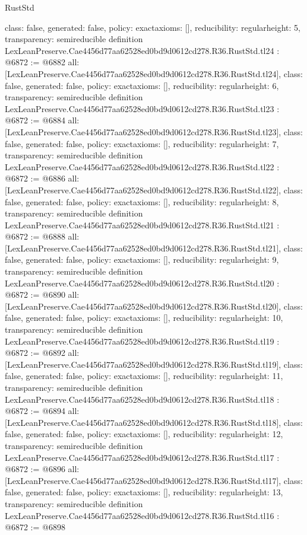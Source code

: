 \begin{lexlean}{RustStd}
\begin{coremodule}
{  class: false,
  generated: false,
  policy: exact{axioms: []},
  reducibility: regular{height: 5},
  transparency: semireducible
}
definition LexLeanPreserve.Cae4456d77aa62528ed0bd9d0612cd278.R36.RustStd.tl24 : @6872 := @6882 {
  all: [LexLeanPreserve.Cae4456d77aa62528ed0bd9d0612cd278.R36.RustStd.tl24],
  class: false,
  generated: false,
  policy: exact{axioms: []},
  reducibility: regular{height: 6},
  transparency: semireducible
}
definition LexLeanPreserve.Cae4456d77aa62528ed0bd9d0612cd278.R36.RustStd.tl23 : @6872 := @6884 {
  all: [LexLeanPreserve.Cae4456d77aa62528ed0bd9d0612cd278.R36.RustStd.tl23],
  class: false,
  generated: false,
  policy: exact{axioms: []},
  reducibility: regular{height: 7},
  transparency: semireducible
}
definition LexLeanPreserve.Cae4456d77aa62528ed0bd9d0612cd278.R36.RustStd.tl22 : @6872 := @6886 {
  all: [LexLeanPreserve.Cae4456d77aa62528ed0bd9d0612cd278.R36.RustStd.tl22],
  class: false,
  generated: false,
  policy: exact{axioms: []},
  reducibility: regular{height: 8},
  transparency: semireducible
}
definition LexLeanPreserve.Cae4456d77aa62528ed0bd9d0612cd278.R36.RustStd.tl21 : @6872 := @6888 {
  all: [LexLeanPreserve.Cae4456d77aa62528ed0bd9d0612cd278.R36.RustStd.tl21],
  class: false,
  generated: false,
  policy: exact{axioms: []},
  reducibility: regular{height: 9},
  transparency: semireducible
}
definition LexLeanPreserve.Cae4456d77aa62528ed0bd9d0612cd278.R36.RustStd.tl20 : @6872 := @6890 {
  all: [LexLeanPreserve.Cae4456d77aa62528ed0bd9d0612cd278.R36.RustStd.tl20],
  class: false,
  generated: false,
  policy: exact{axioms: []},
  reducibility: regular{height: 10},
  transparency: semireducible
}
definition LexLeanPreserve.Cae4456d77aa62528ed0bd9d0612cd278.R36.RustStd.tl19 : @6872 := @6892 {
  all: [LexLeanPreserve.Cae4456d77aa62528ed0bd9d0612cd278.R36.RustStd.tl19],
  class: false,
  generated: false,
  policy: exact{axioms: []},
  reducibility: regular{height: 11},
  transparency: semireducible
}
definition LexLeanPreserve.Cae4456d77aa62528ed0bd9d0612cd278.R36.RustStd.tl18 : @6872 := @6894 {
  all: [LexLeanPreserve.Cae4456d77aa62528ed0bd9d0612cd278.R36.RustStd.tl18],
  class: false,
  generated: false,
  policy: exact{axioms: []},
  reducibility: regular{height: 12},
  transparency: semireducible
}
definition LexLeanPreserve.Cae4456d77aa62528ed0bd9d0612cd278.R36.RustStd.tl17 : @6872 := @6896 {
  all: [LexLeanPreserve.Cae4456d77aa62528ed0bd9d0612cd278.R36.RustStd.tl17],
  class: false,
  generated: false,
  policy: exact{axioms: []},
  reducibility: regular{height: 13},
  transparency: semireducible
}
definition LexLeanPreserve.Cae4456d77aa62528ed0bd9d0612cd278.R36.RustStd.tl16 : @6872 := @6898 {
}
\end{coremodule}
\end{lexlean}
